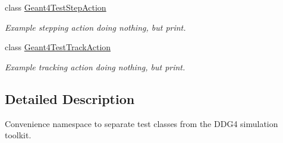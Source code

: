\begin{DoxyCompactItemize}
class \hyperlink{class_d_d4hep_1_1_simulation_1_1_test_1_1_geant4_test_step_action}{Geant4\+Test\+Step\+Action}
\begin{DoxyCompactList}\small\item\em Example stepping action doing nothing, but print. \end{DoxyCompactList}\item 
class \hyperlink{class_d_d4hep_1_1_simulation_1_1_test_1_1_geant4_test_track_action}{Geant4\+Test\+Track\+Action}
\begin{DoxyCompactList}\small\item\em Example tracking action doing nothing, but print. \end{DoxyCompactList}\end{DoxyCompactItemize}


\subsection{Detailed Description}
Convenience namespace to separate test classes from the D\+D\+G4 simulation toolkit. 